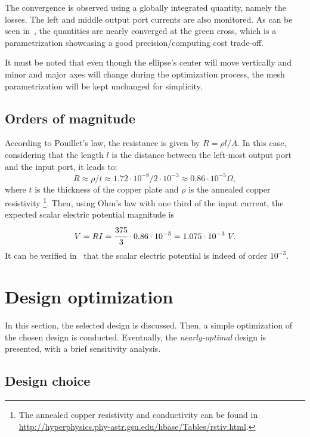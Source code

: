 \documentclass[10pt,a4paper]{article}
\begin{document}
The convergence is observed using a globally integrated quantity, namely the losses.
The left and middle output port currents are also monitored.
As can be seen in~, the quantities are nearly converged at the green cross,
which is a parametrization showcasing a good precision/computing cost trade-off.

It must be noted that even though the ellipse's center will move vertically and minor and major axes will change
during the optimization process,
the mesh parametrization will be kept unchanged for simplicity.

\subsection{Orders of magnitude}

According to Pouillet's law, the resistance is given by $R = \rho l / A$.
In this case, considering that the length $l$ is the distance between the left-most output port
and the input port, it leads to:
%
\begin{equation}
    R \approx \rho /t \approx 1.72 \cdot 10^{-8} / 2 \cdot 10^{-3} \approx 0.86 \cdot 10^{-5} \Omega,
\end{equation}
%
where $t$ is the thickness of the copper plate and $\rho$ is the annealed copper resistivity
\footnote{The annealed copper resistivity and conductivity can be found in
\url{http://hyperphysics.phy-astr.gsu.edu/hbase/Tables/rstiv.html}.}.
Then, using Ohm's law with one third of the input current, the expected scalar electric potential magnitude is
%
\begin{equation}
    V = R I = \cfrac{375}{3} \cdot 0.86 \cdot 10^{-5} = 1.075 \cdot 10^{-3} \ V.
\end{equation}
%
It can be verified in~ that the scalar electric potential is indeed
of order $10^{-3}$.

\section{Design optimization}

In this section, the selected design is discussed.
Then, a simple optimization of the chosen design is conducted.
Eventually, the \emph{nearly-optimal} design is presented, with a brief sensitivity analysis.

\subsection{Design choice}
\end{document}
